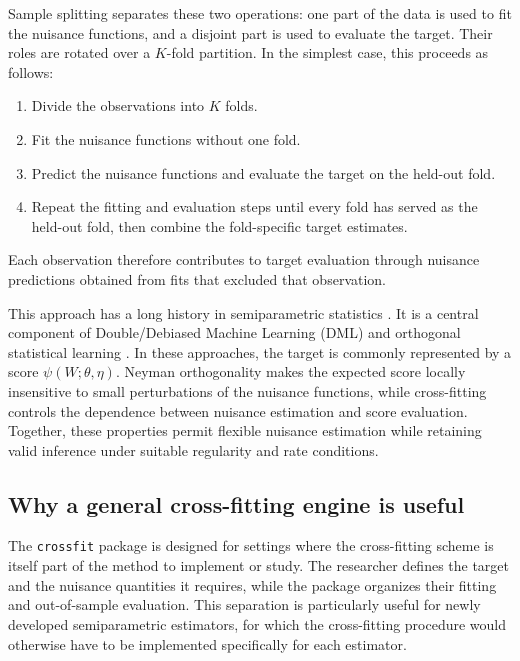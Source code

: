 Sample splitting separates these two operations: one part of the data is used to fit the nuisance functions, and a disjoint part is used to evaluate the target. Their roles are rotated over a \(K\)-fold partition. In the simplest case, this proceeds as follows:

\begin{enumerate}
\def\labelenumi{\arabic{enumi}.}
\tightlist
\item
  Divide the observations into \(K\) folds.
\item
  Fit the nuisance functions without one fold.
\item
  Predict the nuisance functions and evaluate the target on the held-out fold.
\item
  Repeat the fitting and evaluation steps until every fold has served as the held-out fold, then combine the fold-specific target estimates.
\end{enumerate}

Each observation therefore contributes to target evaluation through nuisance predictions obtained from fits that excluded that observation.

This approach has a long history in semiparametric statistics \citep{bickel1982, schick1986, zheng2011, newey2018}. It is a central component of Double/Debiased Machine Learning (DML) \citep{chernozhukov2018} and orthogonal statistical learning \citep{foster2023}. In these approaches, the target is commonly represented by a score \(\psi(W; \theta, \eta)\). Neyman orthogonality makes the expected score locally insensitive to small perturbations of the nuisance functions, while cross-fitting controls the dependence between nuisance estimation and score evaluation. Together, these properties permit flexible nuisance estimation while retaining valid inference under suitable regularity and rate conditions.

\subsection{Why a general cross-fitting engine is useful}\label{subsec:need}

The \texttt{crossfit} package is designed for settings where the cross-fitting scheme is itself part of the method to implement or study. The researcher defines the target and the nuisance quantities it requires, while the package organizes their fitting and out-of-sample evaluation. This separation is particularly useful for newly developed semiparametric estimators, for which the cross-fitting procedure would otherwise have to be implemented specifically for each estimator.

